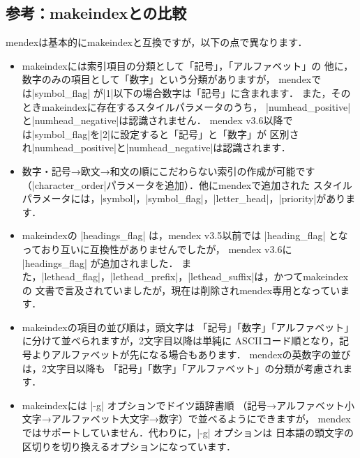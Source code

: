 \documentclass[a4paper,dvipdfmx]{jsarticle}
\newcommand{\SoftName}[1]{\textsf{#1}}
\begin{document}
\subsection{参考：\SoftName{makeindex}との比較}
\SoftName{mendex}は基本的に\SoftName{makeindex}と互換ですが，以下の点で異なります．

\begin{itemize}
\item \SoftName{makeindex}には索引項目の分類として「記号」，「アルファベット」の
  他に，数字のみの項目として「数字」という分類がありますが，
  \SoftName{mendex}では|symbol_flag| が|1|以下の場合数字は「記号」に含まれます．
  また，そのとき\SoftName{makeindex}に存在するスタイルパラメータのうち，
  |numhead_positive|と|numhead_negative|は認識されません．
  \SoftName{mendex} v3.6以降では|symbol_flag|を|2|に設定すると「記号」と「数字」が
  区別され|numhead_positive|と|numhead_negative|は認識されます．

\item 数字・記号→欧文→和文の順にこだわらない索引の作成が可能です
  （|character_order|パラメータを追加）．他に\SoftName{mendex}で追加された
  スタイルパラメータには，|symbol|，|symbol_flag|，|letter_head|，|priority|があります．

\item \SoftName{makeindex}の |headings_flag| は，\SoftName{mendex} v3.5以前では
  |heading_flag| となっており互いに互換性がありませんでしたが，
  \SoftName{mendex} v3.6に |headings_flag| が追加されました．
  また，|lethead_flag|，|lethead_prefix|，|lethead_suffix|は，かつて\SoftName{makeindex}の
  文書で言及されていましたが，現在は削除され\SoftName{mendex}専用となっています．

\item \SoftName{makeindex}の項目の並び順は，頭文字は
  「記号」「数字」「アルファベット」に分けて並べられますが，2文字目以降は単純に
  ASCIIコード順となり，記号よりアルファベットが先になる場合もあります．
  \SoftName{mendex}の英数字の並びは，2文字目以降も
  「記号」「数字」「アルファベット」の分類が考慮されます．

\item \SoftName{makeindex}には |-g| オプションでドイツ語辞書順
  （記号→アルファベット小文字→アルファベット大文字→数字）で並べるようにできますが，
  \SoftName{mendex}ではサポートしていません．代わりに，|-g| オプションは
  日本語の頭文字の区切りを切り換えるオプションになっています．
\end{itemize}

%
%
\end{document}

